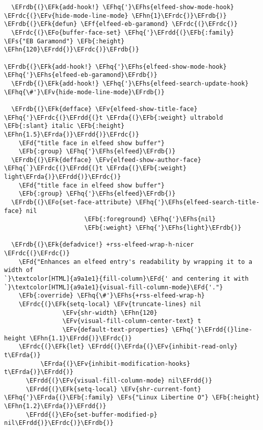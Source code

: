 \documentclass[a4wide,10pt]{article}
\newcommand{\EFs}[1]{\textcolor{EFs}{#1}} %
\newcommand{\EFd}[1]{\textcolor{EFd}{#1}} %
\newcommand{\EFk}[1]{\textcolor{EFk}{#1}} %
\newcommand{\EFb}[1]{\textcolor{EFb}{#1}} %
\newcommand{\EFf}[1]{\textcolor{EFf}{#1}} %
\newcommand{\EFv}[1]{\textcolor{EFv}{#1}} %
\newcommand{\EFo}[1]{\textcolor{EFo}{#1}} %
\newcommand{\EFhn}[1]{\textcolor{EFhn}{\textbf{#1}}} %
\newcommand{\EFhq}[1]{\textcolor{EFhq}{#1}} %
\newcommand{\EFhs}[1]{\textcolor{EFhs}{#1}} %
\newcommand{\EFrda}[1]{\textcolor{EFrda}{#1}} %
\newcommand{\EFrdb}[1]{\textcolor{EFrdb}{#1}} %
\newcommand{\EFrdc}[1]{\textcolor{EFrdc}{#1}} %
\newcommand{\EFrdd}[1]{\textcolor{EFrdd}{#1}} %
\begin{document}
\begin{Code}
\begin{Verbatim}
  \EFrdb{(}\EFk{add-hook!} \EFhq{'}\EFhs{elfeed-show-mode-hook} \EFrdc{(}\EFv{hide-mode-line-mode} \EFhn{1}\EFrdc{)}\EFrdb{)}
\EFrdb{(}\EFk{defun} \EFf{elfeed-eb-garamond} \EFrdc{(}\EFrdc{)}
  \EFrdc{(}\EFo{buffer-face-set} \EFhq{'}\EFrdd{(}\EFb{:family} \EFs{"EB Garamond"} \EFb{:height} \EFhn{120}\EFrdd{)}\EFrdc{)}\EFrdb{)}

\EFrdb{(}\EFk{add-hook!} \EFhq{'}\EFhs{elfeed-show-mode-hook} \EFhq{'}\EFhs{elfeed-eb-garamond}\EFrdb{)}
  \EFrdb{(}\EFk{add-hook!} \EFhq{'}\EFhs{elfeed-search-update-hook} \EFhq{\#'}\EFv{hide-mode-line-mode}\EFrdb{)}

  \EFrdb{(}\EFk{defface} \EFv{elfeed-show-title-face} \EFhq{'}\EFrdc{(}\EFrdd{(}t \EFrda{(}\EFb{:weight} ultrabold \EFb{:slant} italic \EFb{:height} \EFhn{1.5}\EFrda{)}\EFrdd{)}\EFrdc{)}
    \EFd{"title face in elfeed show buffer"}
    \EFb{:group} \EFhq{'}\EFhs{elfeed}\EFrdb{)}
  \EFrdb{(}\EFk{defface} \EFv{elfeed-show-author-face} \EFhq{`}\EFrdc{(}\EFrdd{(}t \EFrda{(}\EFb{:weight} light\EFrda{)}\EFrdd{)}\EFrdc{)}
    \EFd{"title face in elfeed show buffer"}
    \EFb{:group} \EFhq{'}\EFhs{elfeed}\EFrdb{)}
  \EFrdb{(}\EFo{set-face-attribute} \EFhq{'}\EFhs{elfeed-search-title-face} nil
                      \EFb{:foreground} \EFhq{'}\EFhs{nil}
                      \EFb{:weight} \EFhq{'}\EFhs{light}\EFrdb{)}

  \EFrdb{(}\EFk{defadvice!} +rss-elfeed-wrap-h-nicer \EFrdc{(}\EFrdc{)}
    \EFd{"Enhances an elfeed entry's readability by wrapping it to a width of
`}\textcolor[HTML]{a9a1e1}{fill-column}\EFd{' and centering it with `}\textcolor[HTML]{a9a1e1}{visual-fill-column-mode}\EFd{'."}
    \EFb{:override} \EFhq{\#'}\EFhs{+rss-elfeed-wrap-h}
    \EFrdc{(}\EFk{setq-local} \EFv{truncate-lines} nil
                \EFv{shr-width} \EFhn{120}
                \EFv{visual-fill-column-center-text} t
                \EFv{default-text-properties} \EFhq{'}\EFrdd{(}line-height \EFhn{1.1}\EFrdd{)}\EFrdc{)}
    \EFrdc{(}\EFk{let} \EFrdd{(}\EFrda{(}\EFv{inhibit-read-only} t\EFrda{)}
          \EFrda{(}\EFv{inhibit-modification-hooks} t\EFrda{)}\EFrdd{)}
      \EFrdd{(}\EFv{visual-fill-column-mode} nil\EFrdd{)}
      \EFrdd{(}\EFk{setq-local} \EFv{shr-current-font} \EFhq{'}\EFrda{(}\EFb{:family} \EFs{"Linux Libertine O"} \EFb{:height} \EFhn{1.2}\EFrda{)}\EFrdd{)}
      \EFrdd{(}\EFo{set-buffer-modified-p} nil\EFrdd{)}\EFrdc{)}\EFrdb{)}


\end{Verbatim}
\end{Code}
\end{document}
